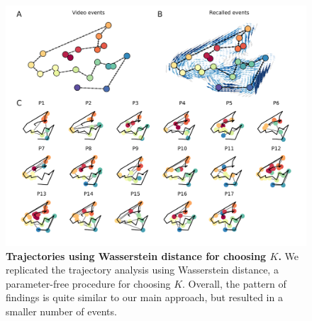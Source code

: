 \documentclass{article}
\begin{document}
\begin{figure}[p!]
  \centering
  \includegraphics[width=\textwidth]{figs/trajectory_wasserstein}
  \caption{\small \textbf{Trajectories using Wasserstein distance for choosing $K$.}  We replicated the trajectory analysis using Wasserstein distance, a parameter-free procedure for choosing $K$. Overall, the pattern of findings is quite similar to our main approach, but resulted in a smaller number of events.}
  \label{fig:trajectory_wasserstein}
  \end{figure}

\newpage
\renewcommand{\refname}{Supplemental references}

\end{document}
